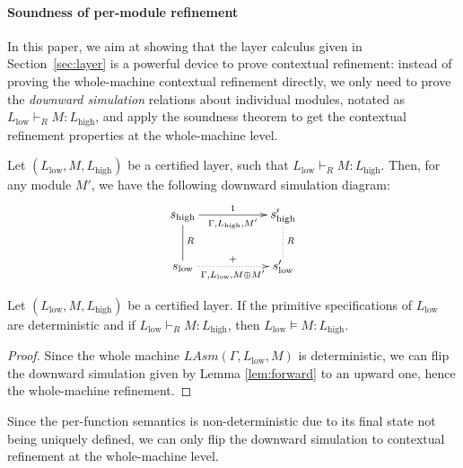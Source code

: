 \paragraph{Soundness of per-module refinement}

In this paper, we aim at showing that the layer calculus given in
Section~{\ref{sec:layer}} is a powerful device to prove contextual
refinement: instead of proving the whole-machine contextual refinement directly, 
we only need to prove the \emph{downward simulation} relations about
individual modules, notated as $L_{\text{low}} \vdash_R M : L_{\text{high}}$, 
and apply the soundness theorem to get the contextual refinement properties
at the whole-machine level.

\begin{lemma} \label{lem:forward}
Let $(L_{\text{low}}, M, L_{\text{high}})$ be a certified layer,
such that $L_{\text{low}} \vdash_R M : L_{\text{high}}$. Then,
for any module $M'$, we have the following downward simulation diagram:
\[
\xymatrix{
s_{\text{high}} \ar[rr]_{\Gamma, L_{\text{high}}, M'}^1 \ar@{-}[d]^R & & s'_{\text{high}} \ar@{.}[d]^R \\
s_{\text{low}} \ar@{.>}[rr]_{\Gamma, L_{\text{low}}, M \oplus M'}^{+} & & s'_{\text{low}}
}
\]
\end{lemma}

\begin{theorem}[Soundness]\label{thm:sound}
Let $(L_{\text{low}}, M, L_{\text{high}})$ be a certified layer. If the
primitive specifications of $L_{\text{low}}$ are deterministic and if
$L_{\text{low}} \vdash_R M : L_{\text{high}}$, then $L_{\text{low}}
\vDash M : L_{\text{high}}$.
\end{theorem}
\begin{proof}
Since the whole machine {\small $LAsm(\Gamma, L_{\text{low}}, M)$} is
deterministic, we can flip the downward simulation given by Lemma
\ref{lem:forward} to an upward one, hence the whole-machine refinement.
\end{proof}

Since the per-function semantics is non-deterministic due to its final
state not being uniquely defined, we can only flip the downward
simulation to contextual refinement at the whole-machine level.



